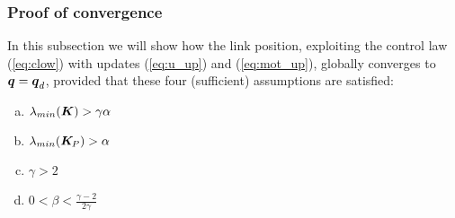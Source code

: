 \subsubsection{Proof of convergence}\label{sec:introduction}
In this subsection we will show how the link position, exploiting the control law (\ref{eq:clow}) with updates (\ref{eq:u_up}) and (\ref{eq:mot_up}), globally converges to \({\boldsymbol{q}} = {\boldsymbol{q}}_d\), provided that these four (sufficient) assumptions are satisfied:
\begin{enumerate}[a)]
    \item \(\lambda_{min}(\boldsymbol{K}) > \gamma \alpha\)
    \item \(\lambda_{min}(\boldsymbol{K}_{\!P}) > \alpha\) 
    \item \(\gamma > 2\)
    \item \(0 < \beta < \frac{\gamma-2}{2\gamma}\)
\end{enumerate}
